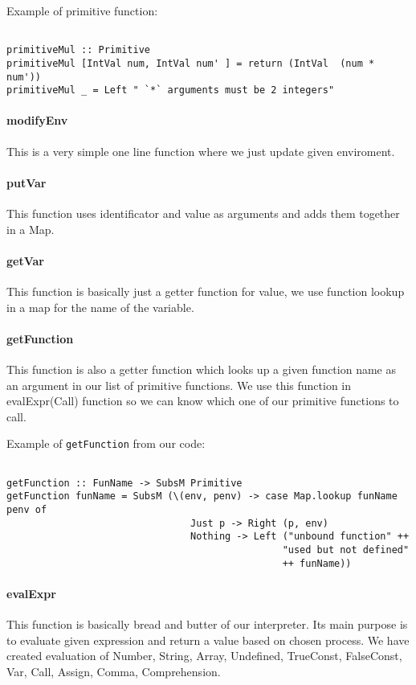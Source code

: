 \documentclass[11pt]{article}
\begin{document}
Example of primitive function:
\begin{verbatim}

primitiveMul :: Primitive
primitiveMul [IntVal num, IntVal num' ] = return (IntVal  (num * num'))
primitiveMul _ = Left " `*` arguments must be 2 integers"

\end{verbatim}


\paragraph{modifyEnv}
This is a very simple one line function where we just update given enviroment.
\paragraph{putVar}
This function uses identificator and value as arguments and adds them together in a Map.
\paragraph{getVar}
This function is basically just a getter function for value, we use function lookup in a map for the name of the variable.
\paragraph{getFunction}
This function is also a getter function which looks up a given function name as an argument in our list of primitive functions.
We use this function in evalExpr(Call) function so we can know which one of our primitive functions to call.



Example of \texttt{getFunction} from our code:
\begin{verbatim}

getFunction :: FunName -> SubsM Primitive
getFunction funName = SubsM (\(env, penv) -> case Map.lookup funName penv of
                                Just p -> Right (p, env)
                                Nothing -> Left ("unbound function" ++
                                                "used but not defined"
                                                ++ funName))
\end{verbatim}


\paragraph{evalExpr}
This function is basically bread and butter of our interpreter. Its main purpose is to evaluate given expression and return a value based on chosen process. We have created evaluation of Number, String, Array, Undefined, TrueConst, FalseConst, Var, Call, Assign, Comma, Comprehension. 
\end{document}

